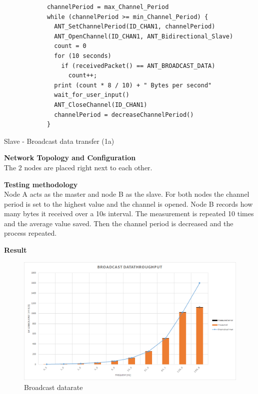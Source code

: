 \begin{description}
		\begin{code}[h]
			\begin{verbatim}
			channelPeriod = max_Channel_Period
			while (channelPeriod >= min_Channel_Period) {
			  ANT_SetChannelPeriod(ID_CHAN1, channelPeriod)
			  ANT_OpenChannel(ID_CHAN1, ANT_Bidirectional_Slave)
			  count = 0
			  for (10 seconds) 
			    if (receivedPacket() == ANT_BROADCAST_DATA)
			      count++;			  
			  print (count * 8 / 10) + " Bytes per second"
			  wait_for_user_input()
			  ANT_CloseChannel(ID_CHAN1)
			  channelPeriod = decreaseChannelPeriod()
			}
			\end{verbatim}
			\caption{Slave - Broadcast data transfer (1a)}\label{lst:sExp1}
		\end{code}	
	\item{\textbf{Network Topology and Configuration}} \hfill \\ The 2 nodes are placed right next to each other.
	 \item{\textbf{Testing methodology}} \hfill \\Node A acts as the master and node B as the slave. For both nodes the channel period is set to the highest value and the channel is opened. Node B records how many bytes it received over a 10s interval. The measurement is repeated 10 times and the average value saved. Then the channel period is decreased and the process repeated.
	\item{\textbf{Result}} \hfill \\  
	\begin{figure}[h]
	\centering
	\includegraphics[scale=0.5]{./pics/exp1_norm.png}
	\caption{Broadcast datarate}\label{fig:exp1norm}
	\end{figure}
	

\end{description}
